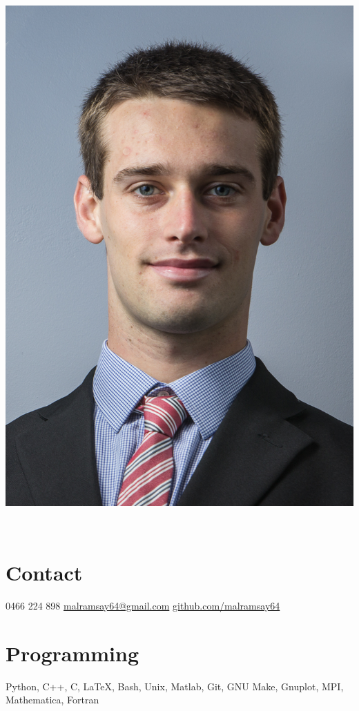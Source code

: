 \documentclass{friggeri-cv} %
\begin{document}


\begin{aside} %
\begin{flushleft}\includegraphics[width=\textwidth]{portrait}\\\end{flushleft}~
\section{Contact}
0466 224 898
\href{mailto:malramsay64@gmail.com}{malramsay64@gmail.com}
\href{github.com/malramsay64}{github.com/malramsay64}
\section{Programming}
Python, C++, C, \LaTeX,
Bash, Unix, Matlab, Git, 
GNU Make, Gnuplot, MPI,
Mathematica, Fortran
\end{aside}
\end{document}
